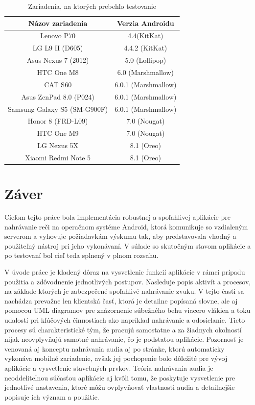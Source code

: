 \begin{table}[hbt]
\centering
\caption{Zariadenia, na ktorých prebehlo testovanie}
\label{devices}
\begin{tabular}{|c|c|}
\hline
Názov zariadenia & Verzia Androidu  \\ [0.5ex]
\hline\hline
Lenovo P70 & 4.4(KitKat)\\ \hline
LG L9 II (D605) & 4.4.2 (KitKat)\\ \hline
Asus Nexus 7 (2012) & 5.0 (Lollipop)\\ \hline
HTC One M8 & 6.0 (Marshmallow)\\ \hline
CAT S60 & 6.0.1 (Marshmallow) \\ \hline
Asus ZenPad 8.0 (P024) & 6.0.1 (Marshmallow)  \\ \hline
Samsung Galaxy S5 (SM-G900F) & 6.0.1 (Marshmallow) \\ \hline
Honor 8 (FRD-L09) &  7.0 (Nougat) \\ \hline
HTC One M9 & 7.0 (Nougat)\\ \hline
LG Nexus 5X  & 8.1 (Oreo)\\ \hline
Xiaomi Redmi Note 5 & 8.1 (Oreo)\\ \hline
\end{tabular}
\end{table}


\chapter{Záver}
\label{finale}

Cieľom tejto práce bola implementácia robustnej a spoľahlivej aplikácie pre nahrávanie reči na operačnom systéme Android, ktorá komunikuje so vzdialeným serverom a vyhovuje požiadavkám výskumu tak, aby predstavovala vhodný a použiteľný nástroj pri jeho vykonávaní. V súlade so skutočným stavom aplikácie a po testovaní bol cieľ teda splnený v plnom rozsahu.

V úvode práce je kladený dôraz na vysvetlenie funkcií aplikácie v rámci prípadu použitia a zdôvodnenie jednotlivých postupov. Nasleduje popis aktivít a procesov, na základe ktorých je zabezpečené spoľahlivé nahrávanie zvuku. V tejto časti sa nachádza prevažne len klientská časť, ktorá je detailne popísaná slovne, ale aj pomocou UML diagramov pre znázornenie súbežného behu viacero vlákien a toku udalostí pri kľúčových činnostiach ako napríklad nahrávanie a odosielanie. Tieto procesy sú charakteristické tým, že pracujú samostatne a za žiadnych okolností nijak neovplyvňujú samotné nahrávanie, čo je podstatou aplikácie. Pozornosť je venovaná aj konceptu nahrávania audia aj po stránke, ktorú automaticky vykonáva mobilné zariadenie, avšak jej pochopenie bolo dôležité pre vývoj aplikácie a vysvetlenie stavebných prvkov. Teória nahrávania audia je neoddeliteľnou súčasťou aplikácie aj kvôli tomu, že poskytuje vysvetlenie pre jednotlivé nastavenia, ktoré môžu ovplyvňovať vlastnosti audia a detailnejšie popisuje ich význam a použitie.

